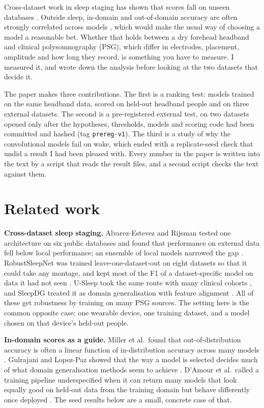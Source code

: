 \documentclass[10pt,twocolumn]{article}
\begin{document}
Cross-dataset work in sleep staging has shown that scores fall on unseen databases
\cite{alvarez2021,robustsleepnet,sleepdg,usleep}. Outside sleep, in-domain and out-of-domain accuracy
are often strongly correlated across models \cite{miller2021}, which would make the usual way of
choosing a model a reasonable bet. Whether that holds between a dry forehead headband and clinical
polysomnography (PSG), which differ in electrodes, placement, amplitude and how long they record, is
something you have to measure. I measured it, and wrote down the analysis before looking at the two
datasets that decide it.

The paper makes three contributions. The first is a ranking test: models trained on the same headband
data, scored on held-out headband people and on three external datasets. The second is a
pre-registered external test, on two datasets opened only after the hypotheses, thresholds, models
and scoring code had been committed and hashed (tag \texttt{prereg-v1}). The third is a study of why
the convolutional models fail on wake, which ended with a replicate-seed check that undid a result
I had been pleased with. Every number in the paper is written into the text by a script that reads
the result files, and a second script checks the text against them.

\section{Related work}

\textbf{Cross-dataset sleep staging.} Alvarez-Estevez and Rijsman tested one architecture on six
public databases and found that performance on external data fell below local performance; an
ensemble of local models narrowed the gap \cite{alvarez2021}. RobustSleepNet was trained
leave-one-dataset-out on eight datasets so that it could take any montage, and kept most of the F1 of a
dataset-specific model on data it had not seen \cite{robustsleepnet}. U-Sleep took the same route with
many clinical cohorts \cite{usleep}, and SleepDG treated it as domain generalisation with feature
alignment \cite{sleepdg}. All of these get robustness by training on many PSG sources. The setting
here is the common opposite case: one wearable device, one training dataset, and a model chosen on
that device's held-out people.

\textbf{In-domain scores as a guide.} Miller et al.\ found that out-of-distribution accuracy is often
a linear function of in-distribution accuracy across many models \cite{miller2021}. Gulrajani and
Lopez-Paz showed that the way a model is selected decides much of what domain generalisation methods
seem to achieve \cite{gulrajani2021}. D'Amour et al.\ called a training pipeline underspecified when
it can return many models that look equally good on held-out data from the training domain but behave
differently once deployed \cite{damour2022}. The seed results below are a small, concrete case of that.
\end{document}

